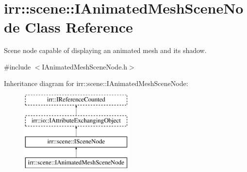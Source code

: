 \hypertarget{classirr_1_1scene_1_1IAnimatedMeshSceneNode}{}\section{irr\+:\+:scene\+:\+:I\+Animated\+Mesh\+Scene\+Node Class Reference}
\label{classirr_1_1scene_1_1IAnimatedMeshSceneNode}


Scene node capable of displaying an animated mesh and its shadow.  




{\ttfamily \#include $<$I\+Animated\+Mesh\+Scene\+Node.\+h$>$}

Inheritance diagram for irr\+:\+:scene\+:\+:I\+Animated\+Mesh\+Scene\+Node\+:\begin{figure}[H]
\begin{center}
\leavevmode
\includegraphics[height=4.000000cm]{classirr_1_1scene_1_1IAnimatedMeshSceneNode}
\end{center}
\end{figure}
